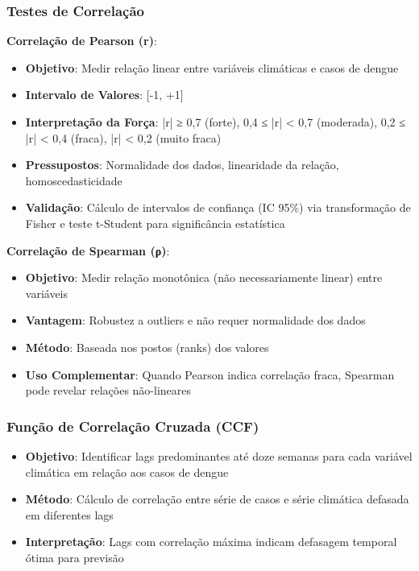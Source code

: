 \subsubsection{Testes de Correlação}

\textbf{Correlação de Pearson (r)}:
\begin{itemize}
    \item \textbf{Objetivo}: Medir relação linear entre variáveis climáticas e casos de dengue
    \item \textbf{Intervalo de Valores}: [-1, +1]
    \item \textbf{Interpretação da Força}: |r| ≥ 0,7 (forte), 0,4 ≤ |r| < 0,7 (moderada), 0,2 ≤ |r| < 0,4 (fraca), |r| < 0,2 (muito fraca)
    \item \textbf{Pressupostos}: Normalidade dos dados, linearidade da relação, homoscedasticidade
    \item \textbf{Validação}: Cálculo de intervalos de confiança (IC 95\%) via transformação de Fisher e teste t-Student para significância estatística
\end{itemize}

\textbf{Correlação de Spearman (ρ)}:
\begin{itemize}
    \item \textbf{Objetivo}: Medir relação monotônica (não necessariamente linear) entre variáveis
    \item \textbf{Vantagem}: Robustez a outliers e não requer normalidade dos dados
    \item \textbf{Método}: Baseada nos postos (ranks) dos valores
    \item \textbf{Uso Complementar}: Quando Pearson indica correlação fraca, Spearman pode revelar relações não-lineares
\end{itemize}

\subsubsection{Função de Correlação Cruzada (CCF)}

\begin{itemize}
    \item \textbf{Objetivo}: Identificar lags predominantes até doze semanas para cada variável climática em relação aos casos de dengue
    \item \textbf{Método}: Cálculo de correlação entre série de casos e série climática defasada em diferentes lags
    \item \textbf{Interpretação}: Lags com correlação máxima indicam defasagem temporal ótima para previsão
\end{itemize}

